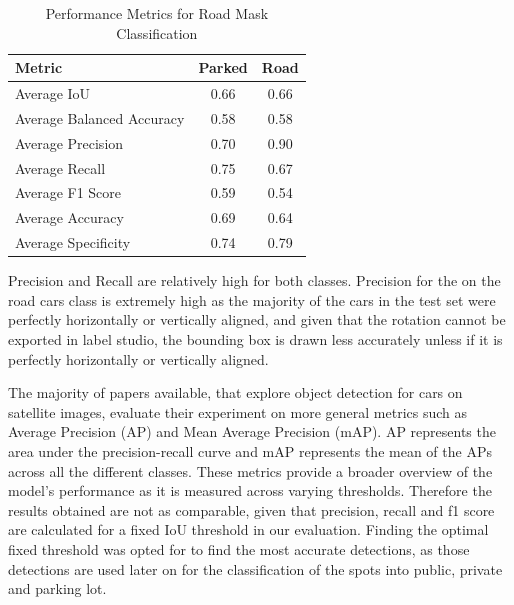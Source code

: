 \begin{table}[htbp]
    \centering
    \begin{tabular}{|l|c|c|}

    \hline
    \textbf{Metric}           & \textbf{Parked} & \textbf{Road} \\ \hline
    Average IoU               & 0.66            & 0.66          \\ \hline
    Average Balanced Accuracy & 0.58            & 0.58          \\ \hline
    Average Precision         & 0.70            & 0.90          \\ \hline
    Average Recall            & 0.75            & 0.67          \\ \hline
    Average F1 Score          & 0.59            & 0.54          \\ \hline
    Average Accuracy          & 0.69            & 0.64          \\ \hline
    Average Specificity       & 0.74            & 0.79          \\ \hline
  \end{tabular}
  \caption{Performance Metrics for Road Mask Classification}
  \label{tab:metrics1}
\end{table}

Precision and Recall are relatively high for both classes. Precision for the on the road cars class is extremely high as the majority of the cars in the test set were perfectly horizontally or vertically aligned, and given that the rotation cannot be exported in label studio, the bounding box is drawn less accurately unless if it is perfectly horizontally or vertically aligned.

The majority of papers available, that explore object detection for cars on satellite images, evaluate their experiment on more general metrics such as Average Precision (AP) and Mean Average Precision (mAP). AP represents the area under the precision-recall curve and mAP represents the mean of the APs across all the different classes. These metrics provide a broader overview of the model's performance as it is measured across varying thresholds.
Therefore the results obtained are not as comparable, given that precision, recall and f1 score are calculated for a fixed IoU threshold in our evaluation.
Finding the optimal fixed threshold was opted for to find the most accurate detections, as those detections are used later on for the classification of the spots into public, private and parking lot.

